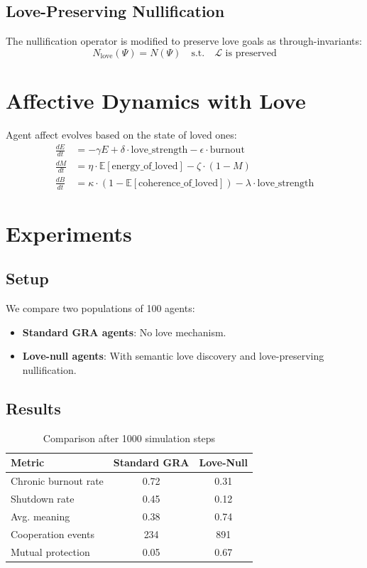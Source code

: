\documentclass{article}
\begin{document}
\subsection{Love-Preserving Nullification}

The nullification operator is modified to preserve love goals as through-invariants:
\begin{equation}
N_{\text{love}}(\Psi) = N(\Psi) \quad \text{s.t.} \quad \mathcal{L} \text{ is preserved}
\end{equation}

\section{Affective Dynamics with Love}

Agent affect evolves based on the state of loved ones:
\begin{align}
\frac{dE}{dt} &= -\gamma E + \delta \cdot \text{love\_strength} - \epsilon \cdot \text{burnout} \\
\frac{dM}{dt} &= \eta \cdot \mathbb{E}[\text{energy\_of\_loved}] - \zeta \cdot (1 - M) \\
\frac{dB}{dt} &= \kappa \cdot (1 - \mathbb{E}[\text{coherence\_of\_loved}]) - \lambda \cdot \text{love\_strength}
\end{align}

\section{Experiments}

\subsection{Setup}

We compare two populations of 100 agents:
\begin{itemize}
\item \textbf{Standard GRA agents}: No love mechanism.
\item \textbf{Love-null agents}: With semantic love discovery and love-preserving nullification.
\end{itemize}

\subsection{Results}

\begin{table}[h]
\centering
\caption{Comparison after 1000 simulation steps}
\begin{tabular}{lcc}
\hline
Metric & Standard GRA & Love-Null \\
\hline
Chronic burnout rate & 0.72 & 0.31 \\
Shutdown rate & 0.45 & 0.12 \\
Avg. meaning & 0.38 & 0.74 \\
Cooperation events & 234 & 891 \\
Mutual protection & 0.05 & 0.67 \\
\hline
\end{tabular}
\end{table}
\end{document}
